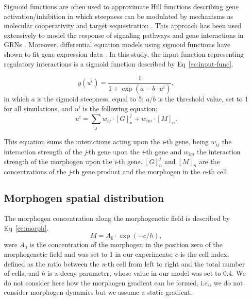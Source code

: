 \documentclass[10pt,letterpaper]{article}
\begin{document}
Sigmoid functions are often used to approximate Hill functions describing gene
activation/inhibition in which steepness can be modulated by mechanisms as
molecular cooperativity and target sequestration \cite{ricci2011}. This approach
has been used extensively to model the response of signaling pathways and gene
interactions in GRNs \cite{mendoza2006, vu2007, zhang2013, armao2016}.
Moreover, differential equation models using sigmoid functions have shown to
fit gene expression data \cite{chen2005, dahlquist2015}. In this study, the
input function representing regulatory interactions is a sigmoid function
described by Eq~\ref{ec:input-func}.

\begin{equation}
 g(u^i) = \frac{1}{1 + \exp(a - b \cdot u^i)},
 \label{ec:input-func}
\end{equation}
\noindent
in which $a$ is the sigmoid steepness, equal to 5; $a/b$ is the threshold value,
set to 1 for all simulations, and $u^i$ is the following equation:
\begin{equation}
 u^i = \sum_j w_{ij} \cdot [G]^j_n + w_{im} \cdot [M]_n.
 \label{ec:mat-sum}
\end{equation}

This equation sums the interactions acting upon the \emph{i}-th gene, being
$w_{ij}$ the interaction strength of the \emph{j}-th gene upon the \emph{i}-th
gene and $w_{im}$ the interaction strength of the morphogen upon the \emph{i}-th
gene. $[G]^j_n$ and $[M]_n$ are the concentrations of the \emph{j}-th gene
product and the morphogen in the \emph{n}-th cell.

\subsection*{Morphogen spatial distribution}

The morphogen concentration along the morphogenetic field is described by
Eq~\ref{ec:morph}.
\begin{equation}
 M = A_0 \cdot \exp(-c/h),
 \label{ec:morph}
\end{equation}
\noindent
were $A_0$ is the concentration of the morphogen in the position zero of the
morphogenetic field and was set to 1 in our experiments; $c$ is the cell index,
defined as the ratio between the \emph{n}-th cell from left to right and the
total number of cells, and $h$ is a decay parameter, whose value in our model
was set to 0.4. We do not consider here how the morphogen gradient can be
formed, i.e., we do not consider morphogen dynamics but we assume a static
gradient.
\end{document}
